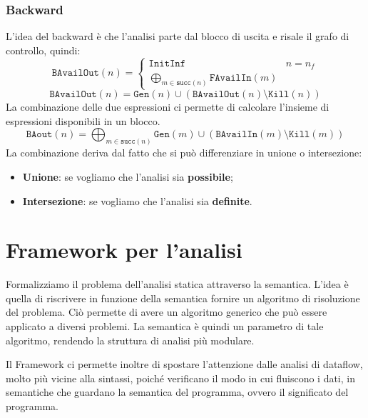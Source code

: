 \subsubsection{Backward}
L'idea del backward è che l'analisi parte dal blocco di uscita e risale il grafo di controllo, quindi:
\begin{equation}
    \texttt{BAvailOut}(n) = 
        \begin{cases}
            \texttt{InitInf} & n = n_f\\
            \bigoplus_{m \in \texttt{succ}(n)} \texttt{FAvailIn}(m)
        \end{cases}
\end{equation}
\begin{equation}
    \texttt{BAvailOut}(n) = \texttt{Gen}(n) \cup (\texttt{BAvailOut}(n) \setminus \texttt{Kill}(n))
\end{equation}
La combinazione delle due espressioni ci permette di calcolare l'insieme di espressioni disponibili in un blocco.
\begin{equation}
\texttt{BAout}(n) = \bigoplus_{m \in \texttt{succ}(n)} \texttt{Gen}(m) \cup (\texttt{BAvailIn}(m)
\setminus \texttt{Kill}(m))
\end{equation}
La combinazione deriva dal fatto che si può differenziare in unione o intersezione:
\begin{itemize}
\item \textbf{Unione}: se vogliamo che l'analisi sia \textbf{possibile};
\item \textbf{Intersezione}: se vogliamo che l'analisi sia \textbf{definite}.
\end{itemize}
\section{Framework per l'analisi}
Formalizziamo il problema dell'analisi statica attraverso la semantica. L'idea è quella di 
riscrivere in funzione della semantica fornire un algoritmo di risoluzione del problema. Ciò 
permette di avere un algoritmo generico che può essere applicato a diversi problemi. La semantica è quindi 
un parametro di tale algoritmo, rendendo la struttura di analisi più modulare.

Il Framework ci permette inoltre di spostare l'attenzione dalle analisi di dataflow, molto più vicine 
alla sintassi, poiché verificano il modo in cui fluiscono i dati, in semantiche che guardano 
la semantica del programma, ovvero il significato del programma.

